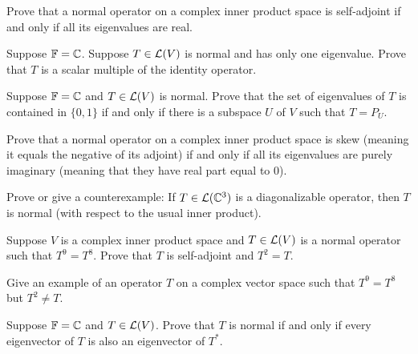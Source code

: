 \begin{exc}

\begin{exercise}
Prove that a normal operator on a complex inner product space is self-adjoint
if and only if all its eigenvalues are real.
\end{exercise}

\begin{exercise}
Suppose $\mathbb{F}=\mathbb{C}$. Suppose $T\in\mathcal{L}(V)$ is normal and has only one eigenvalue.
Prove that $T$ is a scalar multiple of the identity operator.
\end{exercise}

\begin{exercise}
Suppose $\mathbb{F}=\mathbb{C}$ and $T\in\mathcal{L}(V)$ is normal. Prove that the set of eigenvalues
of $T$ is contained in $\{0,1\}$ if and only if there is a subspace $U$ of $V$
such that $T=P_U$.
\end{exercise}

\begin{exercise}
Prove that a normal operator on a complex inner product space is skew (meaning
it equals the negative of its adjoint) if and only if all its eigenvalues are
purely imaginary (meaning that they have real part equal to $0$).
\end{exercise}

\begin{exercise}
Prove or give a counterexample: If $T\in\mathcal{L}(\mathbb{C}^3)$ is a diagonalizable
operator, then $T$ is normal (with respect to the usual inner product).
\end{exercise}

\begin{exercise}
Suppose $V$ is a complex inner product space and $T\in\mathcal{L}(V)$ is a normal
operator such that $T^9=T^8$. Prove that $T$ is self-adjoint and $T^2=T$.
\end{exercise}

\begin{exercise}
Give an example of an operator $T$ on a complex vector space such that
$T^9=T^8$ but $T^2\ne T$.
\end{exercise}

\begin{exercise}
Suppose $\mathbb{F}=\mathbb{C}$ and $T\in\mathcal{L}(V)$. Prove that $T$ is normal if and only if
every eigenvector of $T$ is also an eigenvector of $T^*$.
\end{exercise}


\end{exc}
